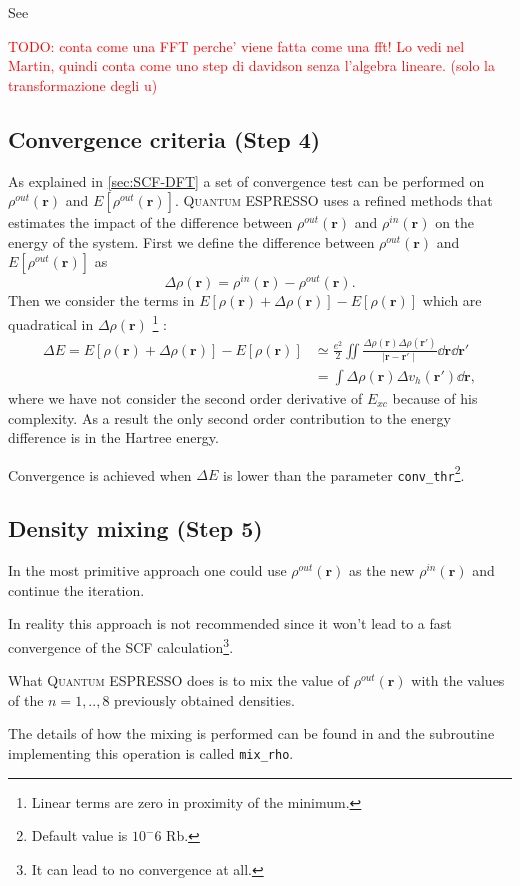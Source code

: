 \documentclass[a4paper,12pt]{article}
\newcommand\mynotes[1]{\begin{flushright}

\textcolor{red}{TODO: #1}\end{flushright}}
\newcommand\dens{\rho(\mathbf{r})}
\newcommand\densin{\rho^{in}(\mathbf{r})}
\newcommand\densout{\rho^{out}(\mathbf{r})}
\newcommand\erre{\mathbf{r}}
\newcommand\QE{\textsc{Quantum} ESPRESSO }
\begin{document}
See \cite[p.246]{Martin}

\mynotes{conta come una FFT perche' viene fatta come una fft! Lo vedi nel Martin, quindi conta come uno step di davidson senza l'algebra lineare. (solo la transformazione degli u)}


\subsection{Convergence criteria (Step 4)}
As explained in \ref{sec:SCF-DFT} a set of convergence test can be performed on $\densout$ and $E[\densout]$.
\QE uses a refined methods that estimates the impact of the difference between $\densout$ and $\densin$ on the energy of the system.
First we define the difference between $\densout$ and $E[\densout]$ as 
\begin{equation}
	\Delta\dens = \densin - \densout.
\end{equation}
Then we consider the terms in $E[\dens + \Delta\dens] - E[\dens ]$ which are quadratical in $\Delta\dens$ \footnote{Linear terms are zero in proximity of the minimum.} :
\begin{align}
	\Delta E = E[\dens + \Delta\dens] - E[\dens ] &\simeq \frac{e^2}{2} \iint \frac{\Delta\rho(\erre) \Delta\rho(\erre')}{\mid \erre - \erre' \mid} \dd{\erre} \dd{\erre'}\\
	 &= \int \Delta\dens \Delta v_{h}(\erre') \dd{\erre},
\end{align}
where we have not consider the second order derivative of $E_{xc}$ because of his complexity.
As a result the only second order contribution to the energy difference is in the Hartree energy.

Convergence is achieved when $\Delta E$ is lower than the parameter \texttt{conv\_thr}\footnote{Default value is $10^-6$ Rb.}.

\subsection{Density mixing (Step 5)}
In the most primitive approach one could use $\densout$ as the new $\densin$ and continue the iteration.

In reality this approach is not recommended since it won't lead to a fast convergence of the SCF calculation\footnote{It can lead to no convergence at all.}.

What \QE does is to mix the value of $\densout$ with the values of the $n=1,..,8$ previously obtained densities.

The details of how the mixing is performed can be found in \cite{Johnson} and the subroutine implementing this operation is called \texttt{mix\_rho}.
\end{document}
